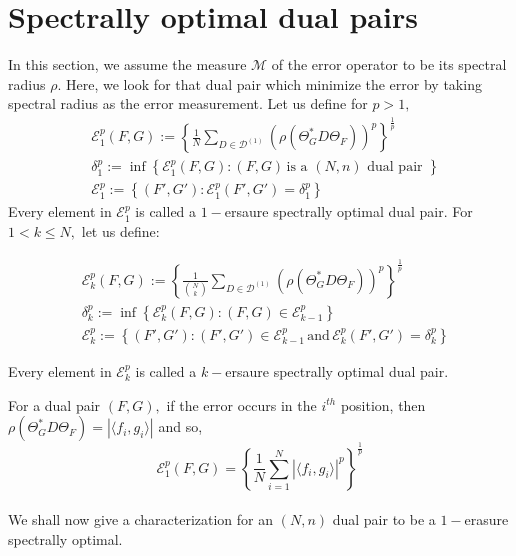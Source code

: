 \documentclass[final,1p,times]{elsarticle}
\begin{document}
	\section{Spectrally optimal dual pairs}
	In this section, we assume the measure $\mathcal{M}$ of the error operator to be its spectral radius $\rho.$ Here, we look for that dual pair which minimize the error by taking spectral radius as the error measurement. Let us define for $p >1,$
 \begin{align*}
		&\mathcal{E}_{1}^p (F,G) := \left\{\frac{1}{N} \sum\limits_{D \in \mathcal{D}^{(1)}}\left( \rho( \Theta_{G}^*D\Theta_{F})\right)^p\right\}^{\frac{1}{p}} \;\\
		& \delta_{1}^p := \inf\left\{ \mathcal{E}_{1}^p (F,G) : (F,G)\, \text{is a $(N,n)$ dual pair }   \right\}\\
     & \mathcal{E}_{1}^p := \left\{(F',G'): \mathcal{E}_{1}^p (F',G') =  \delta_{1}^p  \right\}
	\end{align*}
Every element in $ \mathcal{E}_{1}^p$ is called a $1-$ersaure spectrally optimal dual pair. For  $1<k \leq N,$ let us define:

	 \begin{align*}
		&\mathcal{E}_{k}^p (F,G) := \left\{\frac{1}{\binom{N}{k}} \sum\limits_{D \in \mathcal{D}^{(1)}}\left( \rho( \Theta_{G}^*D\Theta_{F})\right)^p\right\}^{\frac{1}{p}} \,\;\\
		& \delta_{k}^p := \inf\left\{ \mathcal{E}_{k}^p (F,G) : (F,G)\in \mathcal{E}_{k-1}^p    \right\}\\
     & \mathcal{E}_{k}^p := \left\{(F',G'): (F',G') \in \mathcal{E}_{k-1}^p\, \text{and}\,  \mathcal{E}_{k}^p (F',G') =  \delta_{k}^p  \right\}
	\end{align*}

 Every element in $ \mathcal{E}_{k}^p$ is called a $k-$ersaure spectrally optimal dual pair.
	

\noindent
For a dual pair $(F,G),$ if the error occurs in the $i^{th}$ position, then $\rho\left(\Theta_{G}^*D\Theta_{F}\right) = \left|\langle f_i, g_i \rangle \right| $ and so,
	\begin{equation}\label{equation2}
		\mathcal{E}_{1}^p (F,G) = \left\{\frac{1}{N} \sum\limits_{i=1}^N \left|\langle f_i, g_i \rangle \right|^p\right\}^{\frac{1}{p}}
	\end{equation}\\
	 We shall now give a characterization for an $(N,n)$ dual pair to be a $1-$erasure spectrally optimal. 
	
\end{document}
